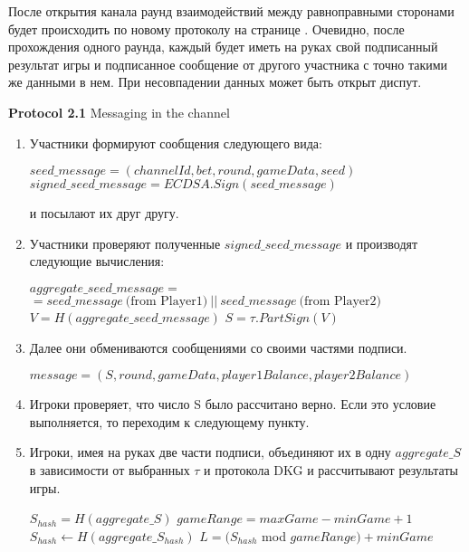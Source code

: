 После открытия канала раунд взаимодействий между равноправными сторонами будет происходить по новому протоколу на странице  \pageref{intchannel1} . Очевидно, после прохождения одного раунда, каждый будет иметь на руках свой подписанный результат игры и подписанное сообщение от другого участника с точно такими же данными в нем. При несовпадении данных может быть открыт диспут.
\begin{algorithm} 
\caption*{\textbf{Protocol 2.1} Messaging in the channel}
\begin{enumerate}
	\item Участники формируют сообщения следующего вида: \label{intchannel1}
\begin{center}
$ seed\_message = (channelId, bet, round, gameData, seed)$
$signed\_seed\_message = ECDSA.Sign(seed\_message)$ 
\end{center}
 и посылают их друг другу.
	\item Участники  проверяют полученные $signed\_seed\_message$ и производят следующие вычисления:
 \begin{algorithmic}
\State $aggregate\_seed\_message =$ \\ $= seed\_message \  \text{(from Player1)} \ ||  \ seed\_message \  \text{(from Player2)}$
\State $V = H(aggregate\_seed\_message)$
\State $S =  \tau .PartSign(V)$
 \end{algorithmic}
\item Далее они обмениваются сообщениями со своими частями подписи.
\begin{center}
 $message = (S, round, gameData, player1Balance, player2Balance)$
\end{center}
	\item Игроки проверяет, что число S было рассчитано верно. Если это условие выполняется, то переходим к следующему пункту.
	\item Игроки, имея на руках две части подписи, объединяют их в одну $aggregate\_S$ в зависимости от выбранных $\tau$ и протокола DKG и рассчитывают результаты игры.
\begin{algorithmic}
\State $S_{hash} = H(aggregate\_S)$
\State $gameRange = maxGame -  minGame + 1$
\State$ S_{hash}\gets H(aggregate\_S_{hash})$
\EndWhile
\State $L = (S_{hash}$ mod $gameRange) + minGame$
\end{algorithmic}
\end{enumerate}
\end{algorithm}
